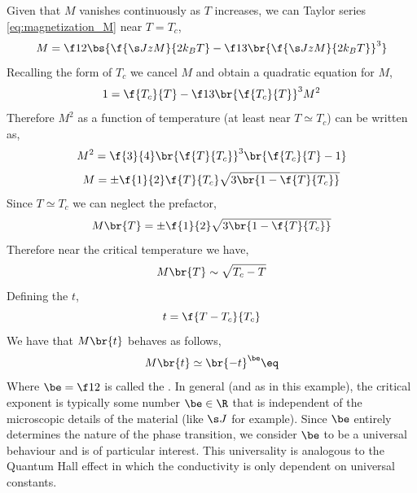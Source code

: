 \documentclass{article}
\begin{document}
Given that $M$ vanishes continuously as $T$ increases, we can Taylor series \cref{eq:magnetization_M} near $T = T_c$,
\[ M = \f12 \bs{\f{\s J z M}{2 k_B T} - \f13 \br{\f{\s J z M}{2 k_B T}}^3} \]
Recalling the form of $T_c$ we cancel $M$ and obtain a quadratic equation for $M$,
\[ 1 = \f{T_c}{T} - \f13 \br{\f{T_c}{T}}^3 M^2 \]
Therefore $M^2$ as a function of temperature (at least near $T \simeq T_c$) can be written as,
\[ M^2 = \f{3}{4} \br{\f{T}{T_c}}^3 \br{\f{T_c}{T} - 1} \]
\[ M = \pm \f{1}{2} \f{T}{T_c} \sqrt{3\br{1 - \f{T}{T_c}}} \]
Since $T \simeq T_c$ we can neglect the prefactor,
\[ M\br{T} = \pm \f{1}{2}\sqrt{3\br{1 - \f{T}{T_c}}} \]
Therefore near the critical temperature we have,
\[ M\br{T} \sim \sqrt{T_c - T} \]
Defining the  $t$,
\[ t = \f{T- T_c}{T_c} \]
We have that $M\br{t}$ behaves as follows,
\[ M\br{t} \simeq \br{- t}^{\be} \eq \label{eq:critical_exponent_onehalf}\]
Where $\be = \f12$ is called the . In general (and as in this example), the critical exponent is typically some number $\be \in \R$ that is independent of the microscopic details of the material (like $\s J$ for example). Since $\be$ entirely determines the nature of the phase transition, we consider $\be$ to be a universal behaviour and is of particular interest. This universality is analogous to the Quantum Hall effect in which the conductivity is only dependent on universal constants. \\
\end{document}
